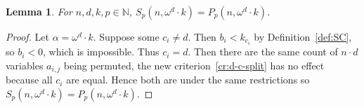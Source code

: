 \documentclass[10pt,a4paper]{article}
\newcommand{\om}{\omega}
\newcommand{\N}{\mathbb{N}}
\newcommand{\numpoints}{n}
\newcommand{\inumpoints}{i}
\newcommand{\idegr}{j}
\newcommand{\commonconst}{a}
\newcommand{\rareconst}{b}
\theoremstyle{plain}
\newtheorem{lemma}[theorem]{Lemma}
\theoremstyle{definition}
\begin{document}
\begin{lemma}
\label{le:D-is-P}
For $\numpoints,d,k,p \in \N$, $S_p(\numpoints, \om^d \cdot k) = P_p(\numpoints, \om^d \cdot k)$.
\end{lemma}
\begin{proof}
Let $\alpha = \om^d \cdot k$. Suppose some $c_{\inumpoints} \neq d$. Then $\rareconst_{\inumpoints} < k_{c_{\inumpoints}}$ by Definition~\ref{def:SC}, so $\rareconst_{\inumpoints} < 0$, which is impossible. Thus $c_{\inumpoints} = d$. Then there are the same count of $\numpoints \cdot d$ variables  $\commonconst_{\inumpoints,\idegr}$ being permuted, the new criterion~\ref{cr:d-c-split} has no effect because all $c_{\inumpoints}$ are equal. Hence both are under the same restrictions so $S_p(\numpoints, \om^d \cdot k) = P_p(\numpoints, \om^d \cdot k)$.
\end{proof}
\end{document}
